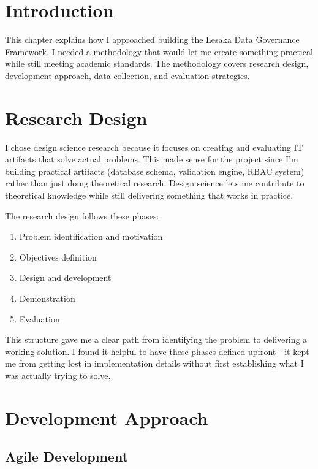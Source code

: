 
\section{Introduction}

This chapter explains how I approached building the Lesaka Data Governance Framework. I needed a methodology that would let me create something practical while still meeting academic standards. The methodology covers research design, development approach, data collection, and evaluation strategies.

\section{Research Design}

I chose design science research \cite{hevner2004design} because it focuses on creating and evaluating IT artifacts that solve actual problems. This made sense for the project since I'm building practical artifacts (database schema, validation engine, RBAC system) rather than just doing theoretical research. Design science lets me contribute to theoretical knowledge while still delivering something that works in practice.

The research design follows these phases:

\begin{enumerate}
    \item Problem identification and motivation
    \item Objectives definition
    \item Design and development
    \item Demonstration
    \item Evaluation
\end{enumerate}

This structure gave me a clear path from identifying the problem to delivering a working solution. I found it helpful to have these phases defined upfront - it kept me from getting lost in implementation details without first establishing what I was actually trying to solve.

\section{Development Approach}

\subsection{Agile Development}

